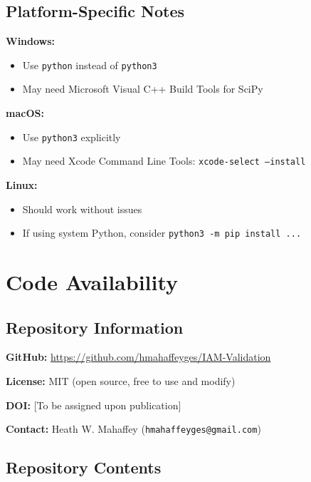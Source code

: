 \documentclass[11pt]{article}
\begin{document}
\subsection{Platform-Specific Notes}

\textbf{Windows:}
\begin{itemize}
    \item Use \texttt{python} instead of \texttt{python3}
    \item May need Microsoft Visual C++ Build Tools for SciPy
\end{itemize}

\textbf{macOS:}
\begin{itemize}
    \item Use \texttt{python3} explicitly
    \item May need Xcode Command Line Tools: \texttt{xcode-select --install}
\end{itemize}

\textbf{Linux:}
\begin{itemize}
    \item Should work without issues
    \item If using system Python, consider \texttt{python3 -m pip install ...}
\end{itemize}

\section{Code Availability}

\subsection{Repository Information}

\textbf{GitHub:} \url{https://github.com/hmahaffeyges/IAM-Validation}

\textbf{License:} MIT (open source, free to use and modify)

\textbf{DOI:} [To be assigned upon publication]

\textbf{Contact:} Heath W. Mahaffey (\texttt{hmahaffeyges@gmail.com})

\subsection{Repository Contents}
\end{document}
